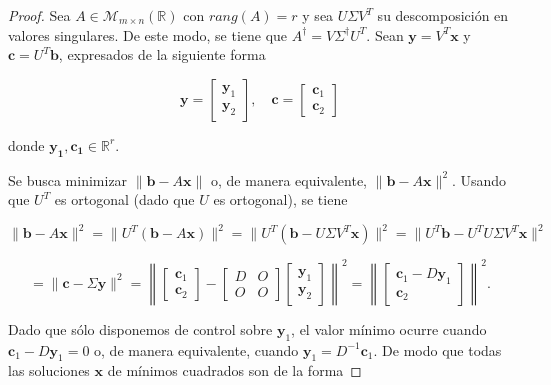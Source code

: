 \begin{proof}
    Sea $A \in \mathcal{M}_{m \times n}(\mathbb{R})$ con $rang(A) = r$ y sea $U\Sigma V^{T}$ su descomposición en valores singulares. De este modo, se tiene que $A^{\dagger} = V \Sigma^{\dagger} U^{T}$. Sean $\mathbf{y}=V^{T}\mathbf{x}$ y $\mathbf{c}=U^{T}\mathbf{b}$, expresados de la siguiente forma

    \[
        \mathbf{y} = \begin{bmatrix} \mathbf{y}_1 \\ \mathbf{y}_2 \end{bmatrix}, \quad 
        \mathbf{c} = \begin{bmatrix} \mathbf{c}_1 \\ \mathbf{c}_2 \end{bmatrix}
    \]

    donde $\mathbf{y_1}, \mathbf{c_1} \in \mathbb{R}^{r}$.\newline

    Se busca minimizar $\|\mathbf{b} - A \mathbf{x}\|$ o, de manera equivalente, $\|\mathbf{b} - A \mathbf{x}\|^2$. Usando que $U^T$ es ortogonal (dado que $U$ es ortogonal), se tiene  

    \[
        \|\mathbf{b} - A \mathbf{x}\|^2 = \| U^T (\mathbf{b} - A \mathbf{x}) \|^2 = \| U^T (\mathbf{b} - U \Sigma V^T \mathbf{x}) \|^2 = \| U^T \mathbf{b} - U^T U \Sigma V^T \mathbf{x} \|^2
    \]

    \[
        = \|\mathbf{c} - \Sigma \mathbf{y}\|^2 = \left\| \begin{bmatrix} \mathbf{c}_1 \\ \mathbf{c}_2 \end{bmatrix} - \begin{bmatrix} D & O \\ O & O \end{bmatrix} \begin{bmatrix} \mathbf{y}_1 \\ \mathbf{y}_2 \end{bmatrix} \right\|^2 = \left\| \begin{bmatrix} \mathbf{c}_1 - D \mathbf{y}_1 \\ \mathbf{c}_2 \end{bmatrix} \right\|^2.
    \]\newline

    Dado que sólo disponemos de control sobre $\mathbf{y}_1$, el valor mínimo ocurre cuando $\mathbf{c}_1 - D \mathbf{y}_1 = 0$ o, de manera equivalente, cuando $\mathbf{y}_1 = D^{-1} \mathbf{c}_1$. De modo que todas las soluciones $\mathbf{x}$ de mínimos cuadrados son de la forma  


\end{proof}
